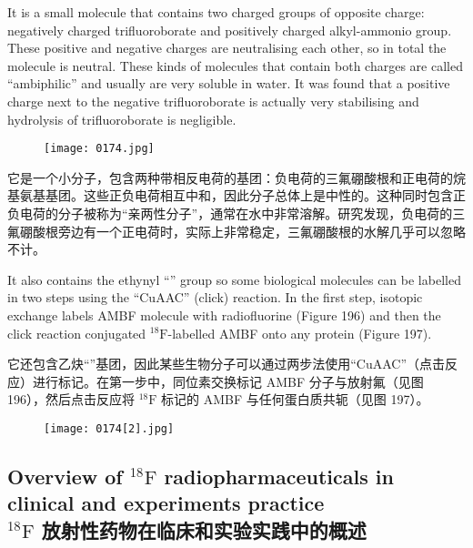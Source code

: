 \documentclass[dvipsnames, svgnames,a4paper,11pt]{article}
\begin{document}
It is a small molecule that contains two charged groups of opposite charge:
negatively charged trifluoroborate and positively charged alkyl-ammonio group.
These positive and negative charges are neutralising each other, so in total the
molecule is neutral. These kinds of molecules that contain both charges are called
“ambiphilic” and usually are very soluble in water. It was found that a positive charge
next to the negative trifluoroborate is actually very stabilising and hydrolysis of
trifluoroborate is negligible.

\begin{figure}[h]
	\centering
    \texttt{[image: 0174.jpg]}   
     \label{fig196}
\end{figure}

它是一个小分子，包含两种带相反电荷的基团：负电荷的三氟硼酸根和正电荷的烷基氨基基团。这些正负电荷相互中和，因此分子总体上是中性的。这种同时包含正负电荷的分子被称为“亲两性分子”，通常在水中非常溶解。研究发现，负电荷的三氟硼酸根旁边有一个正电荷时，实际上非常稳定，三氟硼酸根的水解几乎可以忽略不计。

It also contains the ethynyl “” group so some biological molecules can be
labelled in two steps using the “CuAAC” (click) reaction. In the first step, isotopic
exchange labels AMBF molecule with radiofluorine (Figure 196) and then the click
reaction conjugated ${}^\mathrm{18}\mathrm{F}$-labelled AMBF onto any protein (Figure 197).


它还包含乙炔“”基团，因此某些生物分子可以通过两步法使用“CuAAC”（点击反应）进行标记。在第一步中，同位素交换标记 AMBF 分子与放射氟（见图 196），然后点击反应将 ${}^\mathrm{18}\mathrm{F}$ 标记的 AMBF 与任何蛋白质共轭（见图 197）。

\begin{figure}[h]
	\centering
    \texttt{[image: 0174[2].jpg]}   
     \label{fig197}
\end{figure}

\subsection{Overview of ${}^\mathrm{18}\mathrm{F}$ radiopharmaceuticals in clinical and experiments practice \\${}^\mathrm{18}\mathrm{F}$ 放射性药物在临床和实验实践中的概述}
\end{document}
